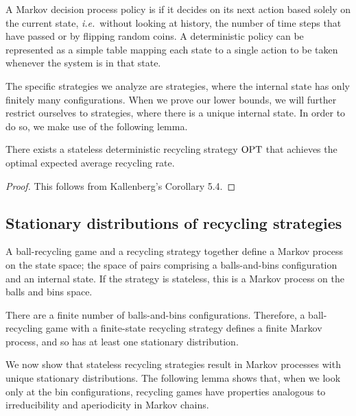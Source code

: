 A Markov decision process policy is  if it decides on its
next action based solely on the current state, \textit{i.e.}\ without looking at
history, the number of time steps that have passed or by flipping random
coins.  A deterministic policy can be represented as a simple table mapping
each state to a single action to be taken whenever the system is in that state.

The specific strategies we analyze are  strategies, where
the internal state has only finitely many configurations.  When we prove our
lower bounds, we will further restrict ourselves to 
strategies, where there is a unique internal state. In order to do so, we make
use of the following lemma.

\begin{lemma}\label{lem:deterministic-opt}
	There exists a stateless deterministic recycling strategy $\textrm{OPT}$ that
	achieves the optimal expected average recycling rate.
\end{lemma}
\begin{proof}
	This follows from Kallenberg's Corollary 5.4.
\end{proof}

\subsection{Stationary distributions of recycling strategies}\label{sec:br-markov}

A ball-recycling game and a recycling strategy together define a Markov
process on the state space; the space of pairs comprising a balls-and-bins
configuration and an internal state. If the strategy is stateless, this is a
Markov process on the balls and bins space.

There are a finite number of balls-and-bins configurations. Therefore, a
ball-recycling game with a finite-state recycling strategy defines a finite
Markov process, and so has at least one stationary distribution.

We now show that stateless recycling strategies result in Markov processes with
unique stationary distributions.  The following lemma shows that, when we look
only at the bin configurations, recycling games have properties analogous to
irreducibility and aperiodicity in Markov chains. 

